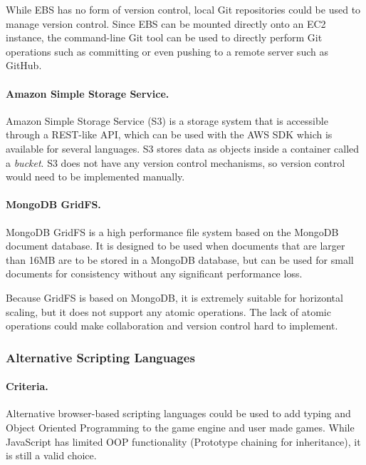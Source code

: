 \documentclass[a4paper, 12pt]{article}
\begin{document}

While EBS has no form of version control, local Git repositories could be used to manage version control. Since EBS can be mounted directly onto an EC2 instance, the command-line Git tool can be used to directly perform Git operations such as committing or even pushing to a remote server such as GitHub.


\paragraph{Amazon Simple Storage Service.}
Amazon Simple Storage Service (S3) is a storage system that is accessible through a REST-like API, which can be used with the AWS SDK which is available for several languages. S3 stores data as objects inside a container called a \emph{bucket}. S3 does not have any version control mechanisms, so version control would need to be implemented manually.

\paragraph{MongoDB GridFS.}
MongoDB GridFS is a high performance file system based on the MongoDB document database. It is designed to be used when documents that are larger than 16MB are to be stored in a MongoDB database, but can be used for small documents for consistency without any significant performance loss. 


Because GridFS is based on MongoDB, it is extremely suitable for horizontal scaling, but it does not support any atomic operations. The lack of atomic operations could make collaboration and version control hard to implement.



\subsubsection{Alternative Scripting Languages}
\paragraph{Criteria.}
Alternative browser-based scripting languages could be used to add typing and Object Oriented Programming to the game engine and user made games. While JavaScript has limited OOP functionality (Prototype chaining for inheritance), it is still a valid choice.
\end{document}
